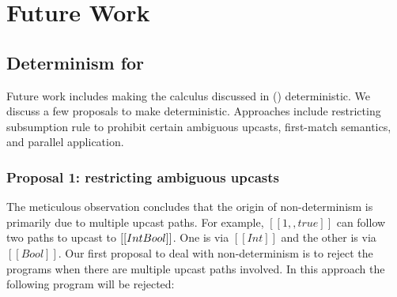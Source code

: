 


\section{Future Work}


\subsection{Determinism for \namems}
\label{future:proposals}

Future work includes making the calculus
discussed in  (\namems) deterministic.
We discuss a few proposals to make \namems
deterministic.
Approaches include restricting subsumption
rule to prohibit certain ambiguous upcasts,
first-match semantics, and parallel application.








\subsubsection{Proposal 1: restricting ambiguous upcasts}

The meticulous observation concludes that the
origin of non-determinism is primarily due to multiple upcast paths.
For example, $[[1,,true]]$ can follow two paths to upcast
to $[[Int\/Bool]]$. One is via $[[Int]]$ and the other is via $[[Bool]]$.
Our first proposal to deal with non-determinism is to reject
the programs when there are multiple upcast paths involved.
In this approach the following program will be rejected:

